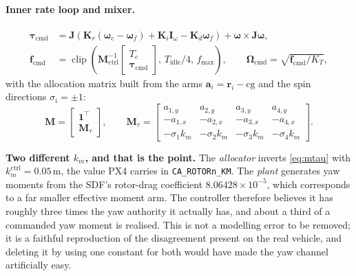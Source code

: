 \documentclass[11pt,a4paper,twoside,openright]{report}
\newcommand{\vKmCtrl}{0.05}              %
\newcommand{\clip}{\operatorname{clip}}
\newcommand{\transp}{^{\!\top}}
\renewcommand{\vec}[1]{\bm{#1}}
\newcommand{\mat}[1]{\bm{#1}}
\newcommand{\bodyrate}{\vec{\omega}}
\theoremstyle{plain}
\theoremstyle{definition}
\theoremstyle{remark}
\begin{document}
	\paragraph{Inner rate loop and mixer.}
	\begin{align}
		\vec\tau_\mathrm{cmd} &=
		\mat J\!\left(\vec K_r(\bodyrate_c-\bodyrate_f)+\vec K_i\vec I_\omega
		-\vec K_d\bodyrate_f\right)+\bodyrate\times\mat J\bodyrate,
		\label{eq:ratepid}\\
		\vec f_\mathrm{cmd} &= \clip\!\left(\mat M_\mathrm{ctrl}^{-1}
		\begin{bmatrix}T_c\\ \vec\tau_\mathrm{cmd}\end{bmatrix},\,
		T_\mathrm{idle}/4,\,f_{\max}\right),
		\qquad
		\vec\Omega_\mathrm{cmd}=\sqrt{\vec f_\mathrm{cmd}/K_T},
		\label{eq:mixer}
	\end{align}
	with the allocation matrix built from the arms $\vec a_i=\vec r_i-\mathrm{cg}$
	and the spin directions $\sigma_i=\pm1$:
	\begin{equation}
		\mat M=\begin{bmatrix}\vec 1\transp\\ \mat M_\tau\end{bmatrix},
		\qquad
		\mat M_\tau=\begin{bmatrix}
			a_{1,y} & a_{2,y} & a_{3,y} & a_{4,y}\\
			-a_{1,x} & -a_{2,x} & -a_{3,x} & -a_{4,x}\\
			-\sigma_1 k_m & -\sigma_2 k_m & -\sigma_3 k_m & -\sigma_4 k_m
		\end{bmatrix}.
		\label{eq:mtau}
	\end{equation}

	\begin{cautionbox}
		\textbf{Two different $k_m$, and that is the point.} The \emph{allocator}
		inverts \cref{eq:mtau} with $k_m^\mathrm{ctrl}=\vKmCtrl\,\si{\metre}$, the value
		PX4 carries in \texttt{CA\_ROTORn\_KM}. The \emph{plant} generates yaw moments
		from the SDF's rotor-drag coefficient $8.06428\times10^{-5}$, which corresponds
		to a far smaller effective moment arm. The controller therefore believes it has
		roughly three times the yaw authority it actually has, and about a third of a
		commanded yaw moment is realised. This is not a modelling error to be removed;
		it is a faithful reproduction of the disagreement present on the real vehicle,
		and deleting it by using one constant for both would have made the yaw channel
		artificially easy.
	\end{cautionbox}
\end{document}
